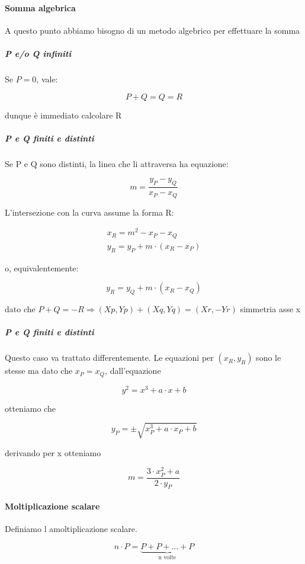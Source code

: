 \documentclass{book}
\theoremstyle{definition}
\begin{document}
\paragraph{Somma algebrica}

A questo punto abbiamo bisogno di un metodo algebrico per effettuare la somma

\subparagraph{P e/o Q infiniti}

Se $P = 0$, vale:

\[
    P + Q = Q = R
\]

dunque è immediato calcolare R

\subparagraph{P e Q finiti e distinti}

Se P e Q sono distinti, la linea che li attraversa ha equazione:

\[
    m = \frac{ y_P - y_Q}{x_P - x_Q}
\]


L'intersezione con la curva assume la forma R:

\[
    \begin{array}{ll}
        x_R = m^{2} - x_P - x_Q \\
        y_R = y_P + m \cdot ( x_R - x_P )
    \end{array}
\]

o, equivalentemente:

\[
    y_R = y_Q + m \cdot (x_R - x_Q )
\]



dato che $P + Q = -R \Rightarrow (Xp, Yp) + (Xq, Yq) = (Xr, -Yr)$ simmetria asse x

\subparagraph{P e Q finiti e distinti}

Questo caso va trattato differentemente. Le equazioni per $(x_R, y_R)$  sono le stesse ma dato che $x_P= x_Q$, dall'equazione

\[
    y^{2} = x^{3} + a \cdot x + b
\]

otteniamo che

\[
    y_P = \pm \sqrt{x_P^{3} + a \cdot x_P + b}
\]

derivando per x otteniamo

\[
    m = \frac{3 \cdot x_P^{2} + a}{2 \cdot y_P}
\]

\paragraph{Moltiplicazione scalare}

Definiamo l amoltiplicazione scalare.

\[
n \cdot P = \underbrace{P + P + \dots + P}_\text{n volte}
\]
\end{document}
